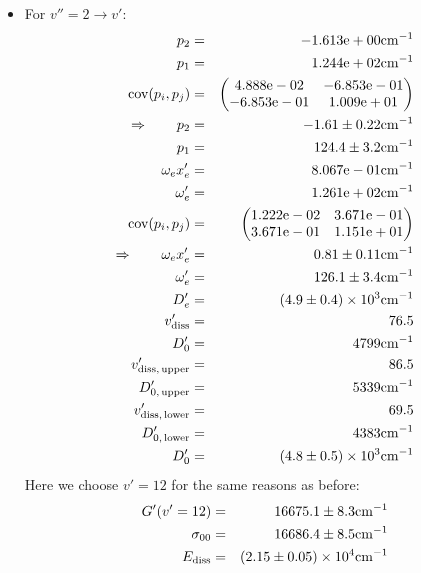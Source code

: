     \begin{itemize}
        \item For $v'' = 2 \rightarrow v'$:
            \begin{eqnarray}
                p_2 &=& -1.613\mathrm{e}+00 \mathrm{cm^{-1}} \nonumber \\
                p_1 &=& 1.244\mathrm{e}+02 \mathrm{cm^{-1}} \nonumber \\
                \mathrm{cov}(p_i, p_j) &=& 
                \begin{pmatrix}
                    4.888\mathrm{e}-02 &-6.853\mathrm{e}-01 \\
                    -6.853\mathrm{e}-01 &1.009\mathrm{e}+01 \\
                \end{pmatrix}
                \\ \Rightarrow \qquad
                p_2 &=& -1.61 \pm 0.22 \mathrm{cm^{-1}}\\
                p_1 &=& 124.4 \pm 3.2 \mathrm{cm^{-1}} \\
                \omega_e x_e' &=& 8.067\mathrm{e}-01 \mathrm{cm^{-1}} \nonumber \\
                \omega_e' &=& 1.261\mathrm{e}+02 \mathrm{cm^{-1}} \nonumber \\
                \mathrm{cov}(p_i, p_j) &=& 
                \begin{pmatrix}
                    1.222\mathrm{e}-02 &3.671\mathrm{e}-01 \\
                3.671\mathrm{e}-01 &1.151\mathrm{e}+01 \\
            \end{pmatrix}
            \\ \Rightarrow \qquad
            \omega_e x_e' &=& 0.81 \pm 0.11 \mathrm{cm^{-1}}\\
            \omega_e' &=& 126.1 \pm 3.4 \mathrm{cm^{-1}} \\
            D_e' &=&\left(4.9 \pm 0.4\right) \times 10^{3} \mathrm{cm^{-1}} \\
            v_\mathrm{diss}' &=& 76.5 \\
            D_0' &=& 4799 \mathrm{cm^{-1}} \\
            v_\mathrm{diss,\, upper}' &=& 86.5 \\
            D_{0,\, \mathrm{upper}}' &=& 5339 \mathrm{cm^{-1}}\\
            v_\mathrm{diss,\, lower}' &=& 69.5 \\
            D_{0,\, \mathrm{lower}}' &=& 4383 \mathrm{cm^{-1}} \\
            D_0' &=& \left(4.8 \pm 0.5\right) \times 10^{3} \mathrm{cm^{-1}} 
        \end{eqnarray}
        Here we choose $v' = 12$ for the same reasons as before: 
        \begin{eqnarray}
            G'(v' = 12) &=& 16675.1 \pm 8.3 \mathrm{cm^{-1}} \\
            \sigma_{00} &=& 16686.4 \pm 8.5 \mathrm{cm^{-1}} \\
            E_\mathrm{diss} &=& \left(2.15 \pm 0.05\right) \times 10^{4} \mathrm{cm^{-1}}
        \end{eqnarray}
\end{itemize}
